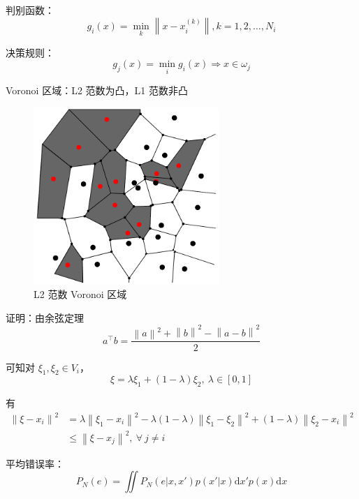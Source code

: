 \documentclass[openany]{ctexbook}
\theoremstyle{kaiti}
\theoremstyle{normal}
\begin{document}
判别函数：
\begin{equation}
g_i(x)=\min_k\left\| x-x_{i}^{\left(k \right)} \right\| , k=1,2,\dots ,N_i
\end{equation}

决策规则：
\begin{equation}
g_j(x)=\min_ig_i(x)\Rightarrow x\in \omega_j
\end{equation}

Voronoi 区域：L2 范数为凸，L1 范数非凸

\begin{figure}
  \centering
  \includegraphics[width=7cm]{1627808452244-6.1-1.png}
  \caption{L2 范数 Voronoi 区域}
\end{figure}

证明：由余弦定理
\begin{equation}
a^{\top}b=\frac{\left\| a \right\|^2+\left\| b \right\|^2-\left\| a-b \right\|^2}{2}
\end{equation}

可知对 $\xi_1,\xi_2\in V_i$，
\begin{equation}
\xi =\lambda \xi_1+\left(1-\lambda \right)\xi_2,~\lambda \in \left[0,1 \right]
\end{equation}

有
\begin{equation}
\begin{aligned}
  \left\| \xi -x_i \right\|^2
  &=\lambda \left\| \xi_1-x_i \right\|^2-\lambda \left(1-\lambda \right)\left\| \xi_1-\xi_2 \right\|^2 +\left(1-\lambda \right)\left\| \xi_2-x_i \right\|^2\\
  &\leqslant \left\| \xi -x_j \right\|^2,~\forall~j\ne i
\end{aligned}
\end{equation}

平均错误率：
\begin{equation}
P_N\left(e \right)=\iint{P_N\left(e|x,x' \right)p\left(x'|x \right)\mathrm{d}x'p(x)\mathrm{d}x}
\end{equation}
\end{document}
